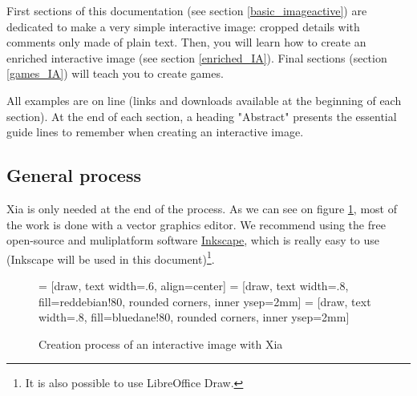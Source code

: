 First sections of this documentation (see section \ref{basic_imageactive}) are dedicated to make a very simple 
interactive image: cropped details with comments only made of plain text.
Then, you will learn how to create an enriched interactive image (see section \ref{enriched_IA}). Final sections (section \ref{games_IA}) will teach you to create games.

\begin{tip}
All examples are on line (links and downloads available at 
the beginning of each section). At the end
of each section, a heading "Abstract" presents the essential guide lines to 
remember when creating an interactive image. 
\end{tip}

\subsection{General process}

Xia is only needed at the end of the process.
As we can see on figure \ref{workflowxia}, most of the work is done with 
a  vector graphics editor. We recommend using the free open-source and 
muliplatform software \href{http://www.inkscape.org/}{Inkscape}, which is 
really easy to use (Inkscape will be used in this document)\footnote{It is also possible 
to use LibreOffice Draw.}.

\begin{figure}[htp]
 \centering
  = [draw, text width=.6\textwidth, align=center]
  = [draw, text width=.8\textwidth, fill=reddebian!80, rounded corners, inner ysep=2mm]
  = [draw, text width=.8\textwidth, fill=bluedane!80, rounded corners, inner ysep=2mm]
 \caption{Creation process of an interactive image with  Xia}
 \label{workflowxia}
\end{figure}

